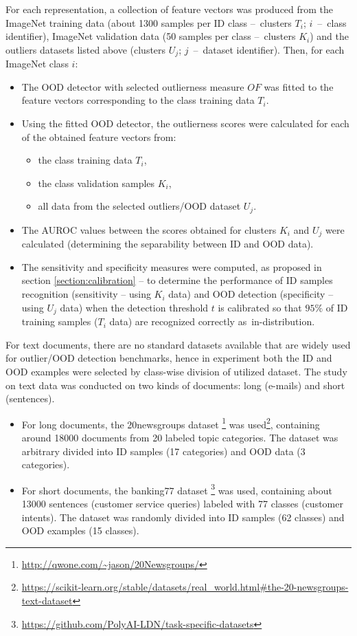 For each representation, a collection of feature vectors was produced from the ImageNet training data (about 1300 samples per ID class –~clusters $T_i$; $i$~–~class identifier), ImageNet validation data (50 samples per class –~clusters $K_i$) and the outliers datasets listed above (clusters $U_j$; $j$~–~dataset identifier). Then, for each ImageNet class $i$:
\vspace{-0.5\baselineskip}
\begin{itemize}
    \item The OOD detector with selected outlierness measure $OF$ was fitted to the feature vectors corresponding to the class training data $T_i$.
    \item Using the fitted OOD detector, the outlierness scores were calculated for each of the obtained feature vectors from:
          \begin{itemize}
              \item the class training data $T_i$,
              \item the class validation samples $K_i$,
              \item all data from the selected outliers/OOD dataset $U_j$.
          \end{itemize}
    \item The AUROC values between the scores obtained for clusters $K_i$ and $U_j$ were calculated (determining the separability between ID and OOD data).
    \item The sensitivity and specificity measures were computed, as proposed in section \ref{section:calibration} – to determine the performance of ID samples recognition (sensitivity – using $K_i$ data) and OOD detection (specificity – using $U_j$ data) when the detection threshold $t$ is calibrated so that $95\%$ of ID training samples ($T_i$ data) are recognized correctly as~in-distribution.
\end{itemize}

For text documents, there are no standard datasets available that are widely used for outlier/OOD detection benchmarks, hence in experiment both the ID and OOD examples were selected by class-wise division of utilized dataset. The study on text data was conducted on two kinds of documents: long (e-mails) and short (sentences).
\vspace{-0.5\baselineskip}
\begin{itemize}
    \item For long documents, the 20newsgroups dataset \cite{Lang-1995}\footnote{\url{http://qwone.com/~jason/20Newsgroups/}} was used\footnote{\scriptsize\url{https://scikit-learn.org/stable/datasets/real_world.html\#the-20-newsgroups-text-dataset}}, containing around 18000 documents from 20 labeled topic categories. The dataset was arbitrary divided into ID samples (17 categories) and OOD data (3 categories).
    \item For short documents, the banking77 dataset \cite{Casanueva-2020}\footnote{\url{https://github.com/PolyAI-LDN/task-specific-datasets}} was used, containing about 13000 sentences (customer service queries) labeled with 77 classes (customer intents). The dataset was randomly divided into ID samples (62 classes) and OOD examples (15 classes).
\end{itemize}

